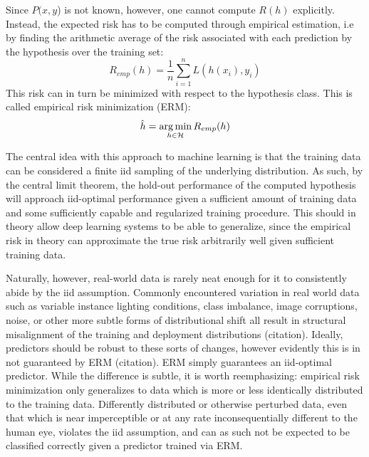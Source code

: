 Since \(P(x,y\)) is not known, however, one cannot compute \(R(h)\) explicitly. Instead, the expected risk has to be computed through empirical estimation, i.e by finding the arithmetic average of the risk associated with each prediction by the hypothesis over the training set:
\begin{equation}
    R_{emp}(h) = \frac{1}{n}\sum_{i=1}^{n}L(h(x_i), y_i)
\end{equation}
This risk can in turn be minimized with respect to the hypothesis class. This is called empirical risk minimization (ERM):
\begin{equation}
    \hat{h} = \operatorname*{arg\,min}_{h \in \mathcal{H}}R_{emp}(h)
\end{equation}

The central idea with this approach to machine learning is that the training data can be considered a finite iid sampling of the underlying distribution. As such, by the central limit theorem, the hold-out performance of the computed hypothesis will approach iid-optimal performance given a sufficient amount of training data and some sufficiently capable and regularized training procedure. This should in theory allow deep learning systems to be able to generalize, since the empirical risk in theory can approximate the true risk arbitrarily well given sufficient training data.

Naturally, however, real-world data is rarely neat enough for it to consistently abide by the iid assumption. Commonly encountered variation in real world data such as variable instance lighting conditions, class imbalance, image corruptions, noise, or other more subtle forms of distributional shift all result in structural misalignment of the training and deployment distributions (citation). Ideally, predictors should be robust to these sorts of changes, however evidently this is in not guaranteed by ERM (citation). ERM simply guarantees an iid-optimal predictor. While the difference is subtle, it is worth reemphasizing: empirical risk minimization only generalizes to data which is more or less identically distributed to the training data. Differently distributed or otherwise perturbed data, even that which is near imperceptible or at any rate inconsequentially different to the human eye, violates the iid assumption, and can as such not be expected to be classified correctly given a predictor trained via ERM.

